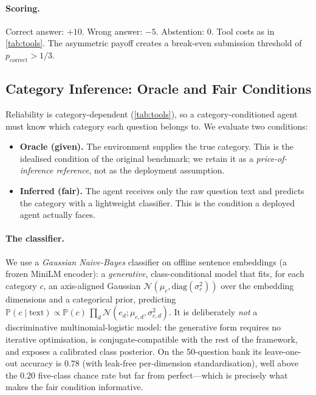 \documentclass[11pt]{article}
\newcommand{\Prob}{\mathbb{P}}
\begin{document}
\paragraph{Scoring.} Correct answer: $+10$. Wrong answer: $-5$. Abstention: $0$. Tool costs as in \cref{tab:tools}. The asymmetric payoff creates a break-even submission threshold of $p_{\text{correct}} > 1/3$.

\subsection{Category Inference: Oracle and Fair Conditions}
\label{sec:inference}

Reliability is category-dependent (\cref{tab:tools}), so a category-conditioned agent must know which category each question belongs to. We evaluate two conditions:

\begin{itemize}
\item \textbf{Oracle (given).} The environment supplies the true category. This is the idealised condition of the original benchmark; we retain it as a \emph{price-of-inference reference}, not as the deployment assumption.
\item \textbf{Inferred (fair).} The agent receives only the raw question text and predicts the category with a lightweight classifier. This is the condition a deployed agent actually faces.
\end{itemize}

\paragraph{The classifier.} We use a \emph{Gaussian Naive-Bayes} classifier on offline sentence embeddings (a frozen MiniLM encoder): a \emph{generative}, class-conditional model that fits, for each category $c$, an axis-aligned Gaussian $\mathcal{N}(\mu_c, \mathrm{diag}(\sigma_c^2))$ over the embedding dimensions and a categorical prior, predicting $\Prob(c \mid \text{text}) \propto \Prob(c)\,\prod_d \mathcal{N}(e_d; \mu_{c,d}, \sigma_{c,d}^2)$. It is deliberately \emph{not} a discriminative multinomial-logistic model: the generative form requires no iterative optimisation, is conjugate-compatible with the rest of the framework, and exposes a calibrated class posterior. On the 50-question bank its leave-one-out accuracy is $0.78$ (with leak-free per-dimension standardisation), well above the $0.20$ five-class chance rate but far from perfect---which is precisely what makes the fair condition informative.
\end{document}
